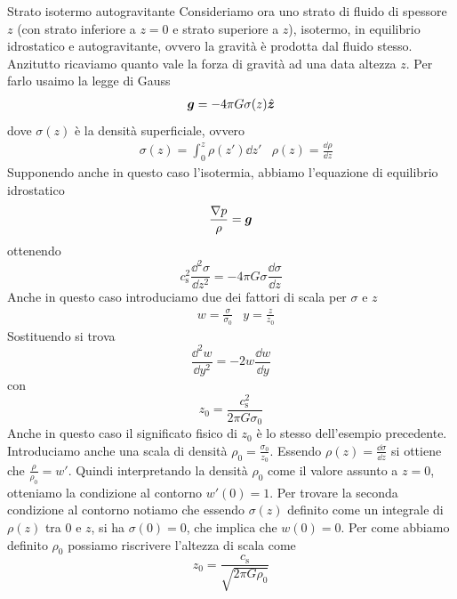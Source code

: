 \begin{Example}{Strato isotermo autogravitante} \label{sec:StratoIsotermoAutogravitante}
Consideriamo ora uno strato di fluido di spessore $z$ (con strato inferiore a $z=0$ e strato superiore a $z$), isotermo, in equilibrio idrostatico e autogravitante, ovvero la gravità è prodotta dal fluido stesso. Anzitutto ricaviamo quanto vale la forza di gravità ad una data altezza $z$. Per farlo usaimo la legge di Gauss
\begin{align*}
\V{g}=-4 \pi G\sigma(z) \V{\hat{z}}
\end{align*}
dove $\sigma(z)$ è la densità superficiale, ovvero
\begin{align}
& \sigma (z) = \int_0^z \rho(z') \dd z'
& \rho (z) = \frac{\dd \rho}{\dd z}
\end{align}
Supponendo anche in questo caso l'isotermia, abbiamo l'equazione di equilibrio idrostatico
\begin{equation}
\frac{\V{\nabla} p}{\rho} = \V{g}
\end{equation}
ottenendo
\begin{equation}
c_\mathrm{s}^2 \frac{\dd^2 \sigma}{\dd z^2} = -4\pi G \sigma \frac{\dd \sigma}{\dd z}
\end{equation}
Anche in questo caso introduciamo due dei fattori di scala per $\sigma$ e $z$
\begin{align*}
& w = \frac{\sigma}{\sigma_0}
& y = \frac{z}{z_0}
\end{align*}
Sostituendo si trova
\begin{equation}
\frac{\dd^2 w}{\dd y^2}=-2 w \frac{\dd w}{\dd y} \label{eq:Diff1}
\end{equation}
con
\begin{equation}
z_0 = \frac{c_\mathrm{s}^2}{2\pi G \sigma_0}
\end{equation}
Anche in questo caso il significato fisico di $z_0$ è lo stesso dell'esempio precedente. Introduciamo anche una scala di densità $\rho_0 = \frac{\sigma_0}{z_0}$. Essendo $\rho(z)=\frac{\dd \sigma}{\dd z}$ si ottiene che $\frac{\rho}{\rho_0}=w'$. Quindi interpretando la densità $\rho_0$ come il valore assunto a $z=0$, otteniamo la condizione al contorno $w'(0)=1$. Per trovare la seconda condizione al contorno notiamo che essendo $\sigma(z)$ definito come un integrale di $\rho(z)$ tra $0$ e $z$, si ha $\sigma(0)=0$, che implica che $w(0)=0$. Per come abbiamo definito $\rho_0$ possiamo riscrivere l'altezza di scala come 
\begin{equation}
z_0=\frac{c_\mathrm{s}}{\sqrt{2\pi G \rho_0}} 

\end{equation}
\end{Example}
